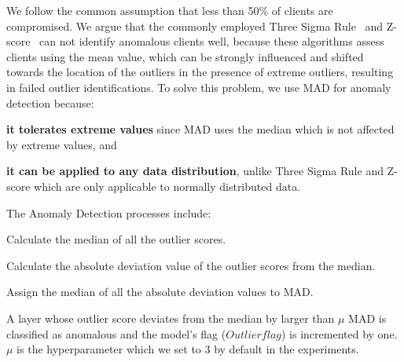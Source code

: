 {We follow the common assumption that less than 50\% of clients are compromised. We argue that the commonly employed Three Sigma Rule~\cite{ThreeSigmaRule} and Z-score~\cite{Zscore}} can not identify anomalous clients well, because these algorithms assess clients using the mean value, which can be strongly influenced and shifted towards the location of the outliers in the presence of extreme outliers, resulting in failed outlier identifications.
To solve this problem, we use MAD for anomaly detection because: 
\begin{enumerate*}
  \item \textbf{it tolerates extreme values} since MAD uses the median which is not affected by extreme values, and 
  \item \textbf{it can be applied to any data distribution}, unlike Three Sigma Rule and Z-score which are only applicable to normally distributed data.%
\end{enumerate*}
The Anomaly Detection processes include: 
\begin{enumerate*}
  \item Calculate the median of all the outlier scores.
  \item Calculate the absolute deviation value of the outlier scores from the median.
  \item Assign the median of all the absolute deviation values to MAD.
  \item A layer whose outlier score deviates from the median by larger than $\mu$ MAD is classified as anomalous and the model's flag ($Outlierflag$) is incremented by one. $\mu$ is the hyperparameter which we set to 3 by default in the experiments.
\end{enumerate*}
